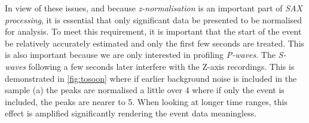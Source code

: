 \documentclass[../report.tex]{subfiles}
\begin{document}
	In view of these issues, and because \textit{z-normalisation} is an important part of \textit{SAX processing}, it is essential that only significant data be presented to be normalised for analysis.  To meet this requirement, it is important that the start of the event be relatively accurately estimated and only the first few seconds are treated.  This is also important because we are only interested in profiling \textit{P-waves}. The \textit{S-waves} following a few seconds later interfere with the Z-axis recordings.  This is demonstrated in \cref{fig:tosoon} where if earlier background noise is included in the sample (a) the peaks are normalised a little over 4 where if only the event is included, the peaks are nearer to 5.  When looking at longer time ranges, this effect is amplified significantly rendering the event data meaningless.
\end{document}
